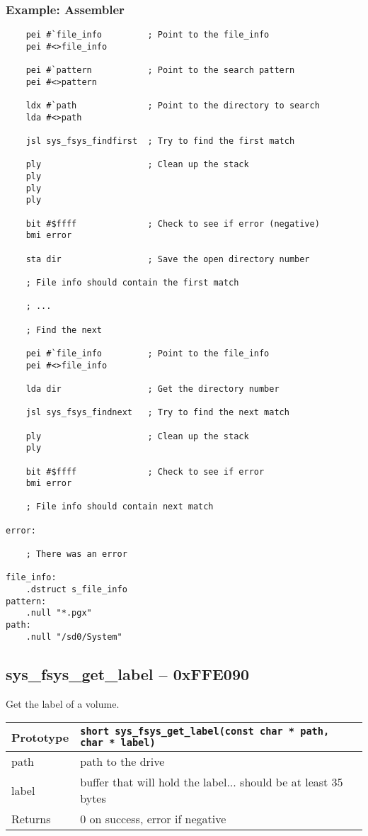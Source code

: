 \subsubsection*{Example: Assembler}
\begin{verbatim}
    pei #`file_info         ; Point to the file_info 
    pei #<>file_info

    pei #`pattern           ; Point to the search pattern
    pei #<>pattern

    ldx #`path              ; Point to the directory to search
    lda #<>path

    jsl sys_fsys_findfirst  ; Try to find the first match

    ply                     ; Clean up the stack
    ply
    ply
    ply

    bit #$ffff              ; Check to see if error (negative)
    bmi error

    sta dir                 ; Save the open directory number

    ; File info should contain the first match

    ; ...

    ; Find the next

    pei #`file_info         ; Point to the file_info
    pei #<>file_info

    lda dir                 ; Get the directory number

    jsl sys_fsys_findnext   ; Try to find the next match

    ply                     ; Clean up the stack
    ply

    bit #$ffff              ; Check to see if error
    bmi error

    ; File info should contain next match

error:

    ; There was an error

file_info:
    .dstruct s_file_info
pattern:
    .null "*.pgx"
path:
    .null "/sd0/System"
\end{verbatim}


\subsection*{sys\_fsys\_get\_label -- 0xFFE090}
Get the label of a volume.

\bigskip

\begin{tabular}{|l||l|} \hline
Prototype & \lstinline!short sys_fsys_get_label(const char * path, char * label)! \\ \hline
path & path to the drive \\ \hline
label & buffer that will hold the label... should be at least 35 bytes \\ \hline
Returns & 0 on success, error if negative \\ \hline
\end{tabular}

